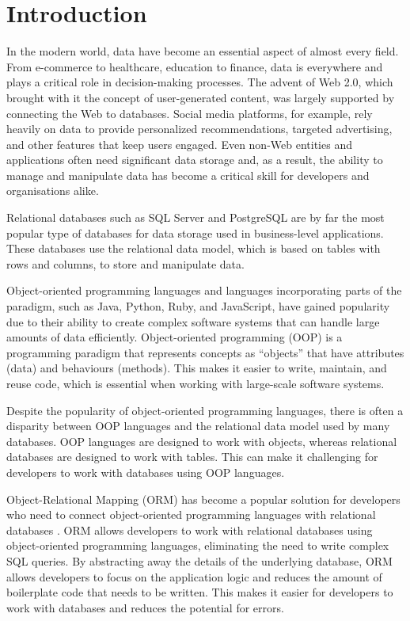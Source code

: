 \chapter{Introduction}

In the modern world, data have become an essential aspect of almost every field.
From e-commerce to healthcare, education to finance, data is everywhere and
plays a critical role in decision-making processes. The advent of Web
2.0\cite{Web2Oreilly}, which brought with it the concept of user-generated
content, was largely supported by connecting the Web to databases. Social media
platforms, for example, rely heavily on data to provide personalized
recommendations, targeted advertising, and other features that keep users
engaged. Even non-Web entities and applications often need significant data
storage and, as a result, the ability to manage and manipulate data has become a
critical skill for developers and organisations alike.

Relational databases such as SQL Server and PostgreSQL are by far the most
popular type of databases for data storage used in business-level applications.
These databases use the relational data model, which is based on tables with
rows and columns, to store and manipulate data.

Object-oriented programming languages and languages incorporating parts of the
paradigm, such as Java, Python, Ruby, and JavaScript, have gained
popularity\cite{stack-overflow-survey} due to their ability to create complex
software systems that can handle large amounts of data efficiently.
Object-oriented programming (OOP) is a programming paradigm that represents
concepts as \enquote{objects} that have attributes (data) and behaviours
(methods). This makes it easier to write, maintain, and reuse code, which is
essential when working with large-scale software systems.

Despite the popularity of object-oriented programming languages, there is often
a disparity between OOP languages and the relational data model used by many
databases. OOP languages are designed to work with objects, whereas relational
databases are designed to work with tables. This can make it challenging for
developers to work with databases using OOP languages. 

Object-Relational Mapping (ORM) has become a popular solution for developers who
need to connect object-oriented programming languages with relational databases
\cite{Torres_Galante_Pimenta_Martins_2017}. ORM allows developers to work with
relational databases using object-oriented programming languages, eliminating
the need to write complex SQL queries. By abstracting away the details of the
underlying database, ORM allows developers to focus on the application logic and
reduces the amount of boilerplate code that needs to be written. This makes it
easier for developers to work with databases and reduces the potential for
errors. 

